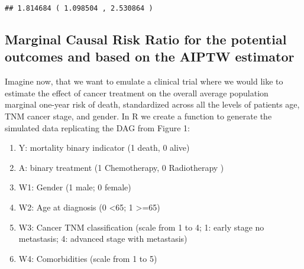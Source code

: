 \documentclass[
]{article}
\providecommand{\tightlist}{%
  \setlength{\itemsep}{0pt}\setlength{\parskip}{0pt}}
\begin{document}
\begin{verbatim}
## 1.814684 ( 1.098504 , 2.530864 )
\end{verbatim}

\hypertarget{marginal-causal-risk-ratio-for-the-potential-outcomes-and-based-on-the-aiptw-estimator}{%
\subsection{Marginal Causal Risk Ratio for the potential outcomes and
based on the AIPTW
estimator}\label{marginal-causal-risk-ratio-for-the-potential-outcomes-and-based-on-the-aiptw-estimator}}

Imagine now, that we want to emulate a clinical trial where we would
like to estimate the effect of cancer treatment on the overall average
population marginal one-year risk of death, standardized across all the
levels of patients age, TNM cancer stage, and gender. In R we create a
function to generate the simulated data replicating the DAG from Figure
1:

\begin{enumerate}
\def\labelenumi{\arabic{enumi}.}
\tightlist
\item
  Y: mortality binary indicator (1 death, 0 alive)
\item
  A: binary treatment (1 Chemotherapy, 0 Radiotherapy )\\
\item
  W1: Gender (1 male; 0 female)\\
\item
  W2: Age at diagnosis (0 \textless65; 1 \textgreater=65)\\
\item
  W3: Cancer TNM classification (scale from 1 to 4; 1: early stage no
  metastasis; 4: advanced stage with metastasis)\\
\item
  W4: Comorbidities (scale from 1 to 5)
\end{enumerate}
\end{document}
